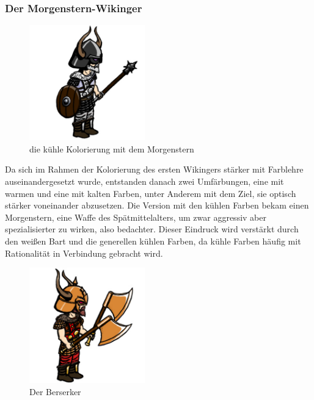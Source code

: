 \documentclass[extern,palatino]{cgBA}
\begin{document}
\subsubsection{Der Morgenstern-Wikinger}
\begin{figure}
	\centering
	\includegraphics[height=5cm]{morningstar.jpg}
	\caption{die kühle Kolorierung mit dem Morgenstern}
\end{figure}
Da sich im Rahmen der Kolorierung des ersten Wikingers stärker mit Farblehre auseinandergesetzt wurde, entstanden danach zwei Umfärbungen, eine mit warmen und eine mit kalten Farben, unter Anderem mit dem Ziel, sie optisch stärker voneinander abzusetzen. Die Version mit den kühlen Farben bekam einen Morgenstern, eine Waffe des Spätmittelalters, um zwar aggressiv aber spezialisierter zu wirken, also bedachter. Dieser Eindruck wird verstärkt durch den weißen Bart und die generellen kühlen Farben, da kühle Farben häufig mit Rationalität in Verbindung gebracht wird.
\newpage
\begin{figure}
	\centering
	\includegraphics[height=5cm]{berserker.jpg}
	\caption{Der Berserker}
\end{figure}
\end{document}
